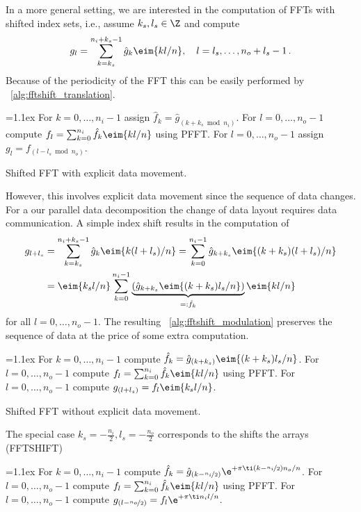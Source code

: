 In a more general setting, we are interested in the computation of FFTs with shifted index sets, i.e., assume $k_s,l_s\in\Z$ and compute
\begin{equation*}
  g_l = \sum_{k=k_s}^{n_i+k_s-1} \hat g_k \eim{kl/n},
  \quad l=l_s,\hdots,n_o+l_s-1\,.
\end{equation*}
Because of the periodicity of the FFT this can be easily performed by \algname~\ref{alg:fftshift_translation}.
\begin{algorithm}\label{alg:fftshift_translation}
  \begin{algorithmic}[1]
    \itemsep=1.1ex
    \State For $k=0,\hdots,n_i-1$ assign $\hat f_k = \hat g_{(k+k_s\bmod n_i)}$.
    \State For $l=0,\hdots,n_o-1$ compute $f_l = \sum_{k=0}^{n_i} \hat f_k \eim{kl/n}$ using PFFT.
    \State For $l=0,\hdots,n_o-1$ assign $g_l = f_{(l-l_s\bmod n_o)}$.
  \end{algorithmic}
  \caption{Shifted FFT with explicit data movement.}
\end{algorithm}
However, this involves explicit data movement since the sequence of data changes.
For a our parallel data decomposition the change of data layout requires data communication.
A simple index shift results in the computation of
\begin{align*}
  g_{l+l_s}
  &=
    \sum_{k=k_s}^{n_i+k_s-1} \hat g_k \eim{k(l+l_s)/n}
    =
    \sum_{k=0}^{n_i-1} \hat g_{k+k_s} \eim{(k+k_s)(l+l_s)/n} \\
  &=
    \eim{k_sl/n} \sum_{k=0}^{n_i-1} \underbrace{\left(\hat g_{k+k_s}\eim{(k+k_s)l_s/n}\right)}_{=: \hat f_k} \eim{kl/n}
\end{align*}
for all $l=0,\hdots,n_o-1$. The resulting \algname~\ref{alg:fftshift_modulation} preserves the sequence of
data at the price of some extra computation.
\begin{algorithm}\label{alg:fftshift_modulation}
  \begin{algorithmic}[1]
    \itemsep=1.1ex
    \State For $k=0,\hdots,n_i-1$ compute $\hat f_k = \hat g_{(k+k_s)} \eim{(k+k_s)l_s/n}$.
    \State For $l=0,\hdots,n_o-1$ compute $f_l = \sum_{k=0}^{n_i} \hat f_k \eim{kl/n}$ using PFFT.
    \State For $l=0,\hdots,n_o-1$ compute $g_{(l+l_s)} = f_l \eim{k_sl/n}$.
  \end{algorithmic}
  \caption{Shifted FFT without explicit data movement.}
\end{algorithm}

The special case $k_s=-\frac{n_i}{2}, l_s=-\frac{n_o}{2}$ corresponds to the shifts the arrays (\textsf{FFTSHIFT})
\begin{algorithm}
  \begin{algorithmic}[1]
    \itemsep=1.1ex
    \State For $k=0,\hdots,n_i-1$ compute $\hat f_k = \hat g_{(k-\nicefrac{n_i}{2})} \e^{+\pi\ti (k-\nicefrac{n_i}{2})n_o/n}$.
    \State For $l=0,\hdots,n_o-1$ compute $f_l = \sum_{k=0}^{n_i} \hat f_k \eim{kl/n}$ using PFFT.
    \State For $l=0,\hdots,n_o-1$ compute $g_{(l-\nicefrac{n_o}{2})} = f_l \e^{+\pi\ti n_i l/n}$.
  \end{algorithmic}
\end{algorithm}




